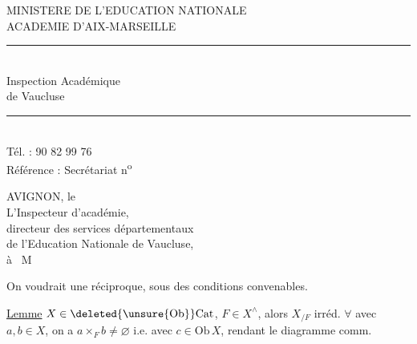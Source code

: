 MINISTERE DE L'EDUCATION NATIONALE\\
ACADEMIE D'AIX-MARSEILLE\\
\rule{2cm}{0.4pt}\\
Inspection Académique\\
de Vaucluse\\
\rule{2cm}{0.4pt}\\
Tél. : 90 82 99 76\\
Référence : Secrétariat n\textsuperscript{o}

AVIGNON, le\\[1ex]
L'Inspecteur d'académie,\\
directeur des services départementaux\\
de l'Education Nationale de Vaucluse,\\[1ex]
à \ M

On voudrait une réciproque, sous des conditions convenables.

\uline{Lemme} $X\in\deleted{\unsure{\mathrm{Ob}}}\mathrm{Cat}$, $F\in X^\wedge$, alors $X_{/F}$ irréd.   $\forall$
avec $a,b\in X$, on a $a\times_F b\ne\varnothing$ i.e. 
avec $c\in\mathrm{Ob}\,X$, rendant le diagramme comm.

